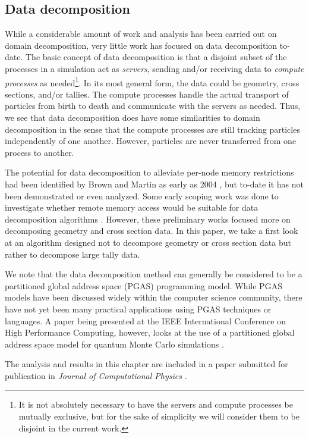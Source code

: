 \subsection{Data decomposition}

While a considerable amount of work and analysis has been carried out on domain
decomposition, very little work has focused on data decomposition to-date. The
basic concept of data decomposition is that a disjoint subset of the processes
in a simulation act as \emph{servers}, sending and/or receiving data to
\emph{compute processes} as needed\footnote{It is not absolutely necessary to
  have the servers and compute processes be mutually exclusive, but for the sake
  of simplicity we will consider them to be disjoint in the current work.}. In
its most general form, the data could be geometry, cross sections, and/or
tallies. The compute processes handle the actual transport of particles from
birth to death and communicate with the servers as needed. Thus, we see that
data decomposition does have some similarities to domain decomposition in the
sense that the compute processes are still tracking particles independently of
one another. However, particles are never transferred from one process to
another.

The potential for data decomposition to alleviate per-node memory restrictions
had been identified by Brown and Martin as early as 2004
\cite{trans-brown-2004}, but to-date it has not been demonstrated or even
analyzed. Some early scoping work was done to investigate whether remote memory
access would be suitable for data decomposition algorithms
\cite{pnst-romano-2011}. However, these preliminary works focused more on
decomposing geometry and cross section data. In this paper, we take a first look
at an algorithm designed not to decompose geometry or cross section data but
rather to decompose large tally data.

We note that the data decomposition method can generally be considered to be a
partitioned global address space (PGAS) programming model. While PGAS models
have been discussed widely within the computer science community, there have not
yet been many practical applications using PGAS techniques or languages. A paper
being presented at the IEEE International Conference on High Performance
Computing, however, looks at the use of a partitioned global address space model
for quantum Monte Carlo simulations \cite{hipc-niu-2012}.

The analysis and results in this chapter are included in a paper submitted for
publication in \emph{Journal of Computational Physics} \cite{jcp-romano-2013}.

